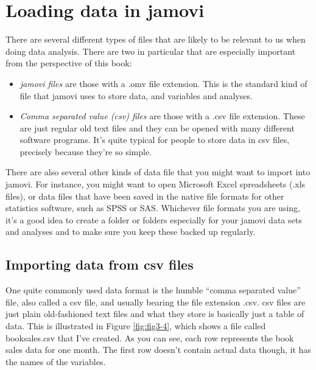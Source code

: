 \documentclass[
]{book}
\begin{document}
\hypertarget{loading-data-in-jamovi}{%
\section{Loading data in jamovi}\label{loading-data-in-jamovi}}

There are several different types of files that are likely to be relevant to us when doing data analysis. There are two in particular that are especially important from the perspective of this book:

\begin{itemize}
\item
  \emph{jamovi files} are those with a .omv file extension. This is the standard kind of file that jamovi uses to store data, and variables and analyses.
\item
  \emph{Comma separated value (csv) files} are those with a .csv file extension. These are just regular old text files and they can be opened with many different software programs. It's quite typical for people to store data in csv files, precisely because they're so simple.
\end{itemize}

There are also several other kinds of data file that you might want to import into jamovi. For instance, you might want to open Microsoft Excel spreadsheets (.xls files), or data files that have been saved in the native file formats for other statistics software, such as SPSS or SAS. Whichever file formats you are using, it's a good idea to create a folder or folders especially for your jamovi data sets and analyses and to make sure you keep these backed up regularly.

\hypertarget{importing-data-from-csv-files}{%
\subsection{Importing data from csv files}\label{importing-data-from-csv-files}}

One quite commonly used data format is the humble ``comma separated value'' file, also called a csv file, and usually bearing the file extension .csv. csv files are just plain old-fashioned text files and what they store is basically just a table of data. This is illustrated in Figure \ref{fig:fig3-4}, which shows a file called booksales.csv that I've created. As you can see, each row represents the book sales data for one month. The first row doesn't contain actual data though, it has the names of the variables.
\end{document}
